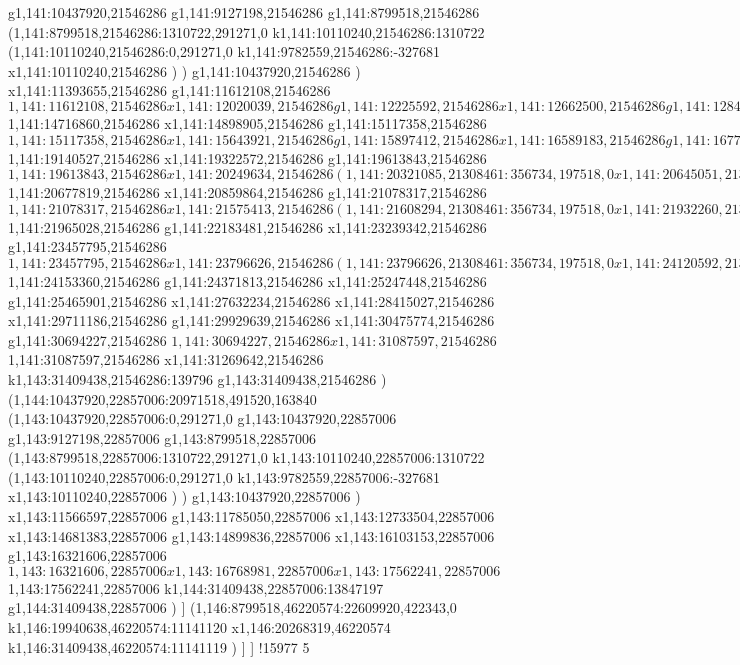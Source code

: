{g1,141:10437920,21546286
g1,141:9127198,21546286
g1,141:8799518,21546286
(1,141:8799518,21546286:1310722,291271,0
k1,141:10110240,21546286:1310722
(1,141:10110240,21546286:0,291271,0
k1,141:9782559,21546286:-327681
x1,141:10110240,21546286
)
)
g1,141:10437920,21546286
)
x1,141:11393655,21546286
g1,141:11612108,21546286
$1,141:11612108,21546286
x1,141:12020039,21546286
g1,141:12225592,21546286
x1,141:12662500,21546286
g1,141:12844540,21546286
x1,141:13317856,21546286
g1,141:13463488,21546286
x1,141:13973214,21546286
g1,141:14118846,21546286
x1,141:14645409,21546286
$1,141:14716860,21546286
x1,141:14898905,21546286
g1,141:15117358,21546286
$1,141:15117358,21546286
x1,141:15643921,21546286
g1,141:15897412,21546286
x1,141:16589183,21546286
g1,141:16771223,21546286
x1,141:17297786,21546286
(1,141:17297786,21644589:294003,295640,0
x1,141:17559021,21644589
)
g1,141:17737421,21546286
x1,141:18174329,21546286
g1,141:18319961,21546286
x1,141:18846524,21546286
(1,141:18846524,21644589:294003,295640,0
x1,141:19107759,21644589
)
$1,141:19140527,21546286
x1,141:19322572,21546286
g1,141:19613843,21546286
$1,141:19613843,21546286
x1,141:20249634,21546286
(1,141:20321085,21308461:356734,197518,0
x1,141:20645051,21308461
)
$1,141:20677819,21546286
x1,141:20859864,21546286
g1,141:21078317,21546286
$1,141:21078317,21546286
x1,141:21575413,21546286
(1,141:21608294,21308461:356734,197518,0
x1,141:21932260,21308461
)
$1,141:21965028,21546286
g1,141:22183481,21546286
x1,141:23239342,21546286
g1,141:23457795,21546286
$1,141:23457795,21546286
x1,141:23796626,21546286
(1,141:23796626,21308461:356734,197518,0
x1,141:24120592,21308461
)
$1,141:24153360,21546286
g1,141:24371813,21546286
x1,141:25247448,21546286
g1,141:25465901,21546286
x1,141:27632234,21546286
x1,141:28415027,21546286
x1,141:29711186,21546286
g1,141:29929639,21546286
x1,141:30475774,21546286
g1,141:30694227,21546286
$1,141:30694227,21546286
x1,141:31087597,21546286
$1,141:31087597,21546286
x1,141:31269642,21546286
k1,143:31409438,21546286:139796
g1,143:31409438,21546286
)
(1,144:10437920,22857006:20971518,491520,163840
(1,143:10437920,22857006:0,291271,0
g1,143:10437920,22857006
g1,143:9127198,22857006
g1,143:8799518,22857006
(1,143:8799518,22857006:1310722,291271,0
k1,143:10110240,22857006:1310722
(1,143:10110240,22857006:0,291271,0
k1,143:9782559,22857006:-327681
x1,143:10110240,22857006
)
)
g1,143:10437920,22857006
)
x1,143:11566597,22857006
g1,143:11785050,22857006
x1,143:12733504,22857006
x1,143:14681383,22857006
g1,143:14899836,22857006
x1,143:16103153,22857006
g1,143:16321606,22857006
$1,143:16321606,22857006
x1,143:16768981,22857006
x1,143:17562241,22857006
$1,143:17562241,22857006
k1,144:31409438,22857006:13847197
g1,144:31409438,22857006
)
]
(1,146:8799518,46220574:22609920,422343,0
k1,146:19940638,46220574:11141120
x1,146:20268319,46220574
k1,146:31409438,46220574:11141119
)
]
]
!15977
}5
